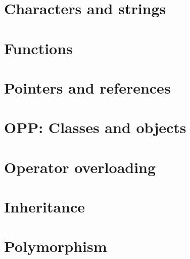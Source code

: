 \documentclass[openany]{book}
\begin{document}
\chapter{Characters and strings}


\chapter{Functions}
 

\chapter{Pointers and references}


\chapter{OPP: Classes and objects}


\chapter{Operator overloading}


\chapter{Inheritance}


\chapter{Polymorphism}


% 

% 

% 

% 

\end{document}
